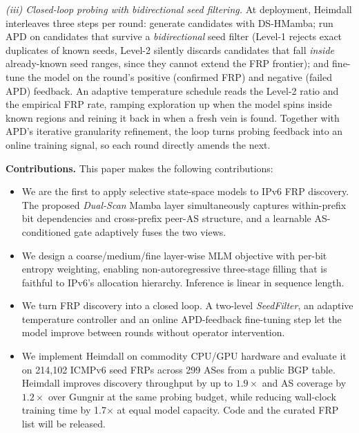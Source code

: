 \documentclass[conference]{IEEEtran}
\begin{document}
\emph{(iii) Closed-loop probing with bidirectional seed filtering.}  At
deployment, Heimdall interleaves three steps per round: generate
candidates with DS-HMamba; run APD on candidates that survive a
\emph{bidirectional} seed filter (Level-1 rejects exact duplicates of
known seeds, Level-2 silently discards candidates that fall \emph{inside}
already-known seed ranges, since they cannot extend the FRP frontier);
and fine-tune the model on the round's positive (confirmed FRP) and
negative (failed APD) feedback.  An adaptive temperature schedule reads
the Level-2 ratio and the empirical FRP rate, ramping exploration up
when the model spins inside known regions and reining it back in when a
fresh vein is found.  Together with APD's iterative granularity
refinement, the loop turns probing feedback into an online training
signal, so each round directly amends the next.

\noindent\textbf{Contributions.}  This paper makes the following
contributions:
\begin{itemize}
\item We are the first to apply selective state-space models to IPv6
      FRP discovery.  The proposed \emph{Dual-Scan} Mamba layer
      simultaneously captures within-prefix bit dependencies and
      cross-prefix peer-AS structure, and a learnable AS-conditioned
      gate adaptively fuses the two views.
\item We design a coarse/medium/fine layer-wise MLM objective with
      per-bit entropy weighting, enabling non-autoregressive
      three-stage filling that is faithful to IPv6's allocation
      hierarchy.  Inference is linear in sequence length.
\item We turn FRP discovery into a closed loop.  A two-level
      \emph{SeedFilter}, an adaptive temperature controller and an
      online APD-feedback fine-tuning step let the model improve
      between rounds without operator intervention.
\item We implement Heimdall on commodity CPU/GPU hardware and
      evaluate it on 214,102 ICMPv6 seed FRPs across 299 ASes from a
      public BGP table.  Heimdall improves discovery throughput by up
      to $1.9\times$ and AS coverage by $1.2\times$ over Gungnir at
      the same probing budget, while reducing wall-clock training
      time by 1.7$\times$ at equal model capacity.  Code and the
      curated FRP list will be released.
\end{itemize}

\end{document}
